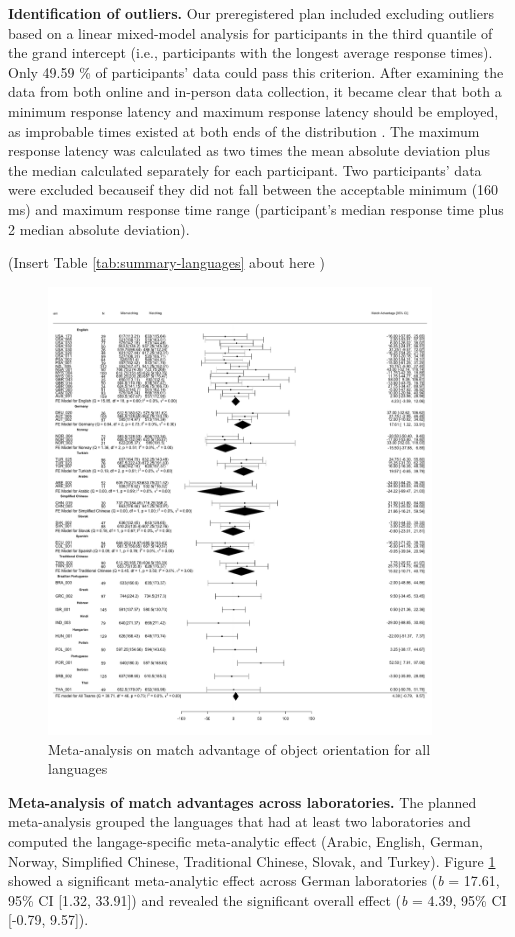 \documentclass[
  man,floatsintext]{apa6}
\begin{document}
\textbf{Identification of outliers.} Our preregistered plan included excluding outliers based on a linear mixed-model analysis for participants in the third quantile of the grand intercept (i.e., participants with the longest average response times). Only 49.59 \% of participants' data could pass this criterion. After examining the data from both online and in-person data collection, it became clear that both a minimum response latency and maximum response latency should be employed, as improbable times existed at both ends of the distribution \autocite{kvalsethHickLawEquivalent2021,proctorHickLawChoice2018}. The maximum response latency was calculated as two times the mean absolute deviation plus the median calculated separately for each participant. Two participants' data were excluded becauseif they did not fall between the acceptable minimum (160 ms) and maximum response time range (participant's median response time plus 2 median absolute deviation).

(Insert Table \ref{tab:summary-languages} about here )

\begin{figure}
\includegraphics[width=4in]{includes/fig/meta-all} \caption{Meta-analysis on match advantage of object orientation for all languages}\label{fig:meta-all-plot}
\end{figure}

\textbf{Meta-analysis of match advantages across laboratories.} The planned meta-analysis grouped the languages that had at least two laboratories and computed the langage-specific meta-analytic effect (Arabic, English, German, Norway, Simplified Chinese, Traditional Chinese, Slovak, and Turkey). Figure \ref{fig:meta-all-plot} showed a significant meta-analytic effect across German laboratories (\emph{b} = 17.61, 95\% CI {[}1.32, 33.91{]}) and revealed the significant overall effect (\emph{b} = 4.39, 95\% CI {[}-0.79, 9.57{]}).
\end{document}
